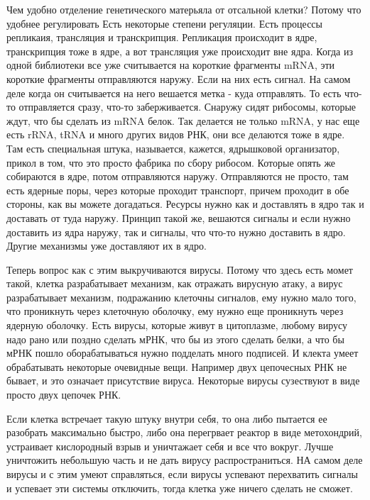 Чем удобно отделение генетического матерьяла от отсальной клетки? 
Потому что удобнее регулировать Есть некоторые степени регуляции. 
Есть процессы репликаия, трансляция и транскрипция. Репликация происходит в ядре, 
транскрипция тоже в ядре, а вот трансляция уже происходит вне ядра. Когда 
из одной библиотеки все уже считывается на короткие фрагменты mRNA, эти 
короткие фрагменты отправляются наружу. Если на них есть сигнал. На самом 
деле когда он считывается на него вешается метка - куда отправлять. То есть 
что-то отправляется сразу, что-то заберживается. Снаружу сидят рибосомы, 
которые ждут, что бы сделать из 
mRNA белок. Так делается не только mRNA, у нас еще есть rRNA, tRNA и 
много других видов РНК, они все делаются тоже в ядре. Там есть 
специальная штука, называется, кажется, ядрышковой организатор, 
прикол в том, что это просто фабрика по сбору рибосом. Которые 
опять же собираются в ядре, потом отправляются наружу. Отправляются 
не просто, там есть ядерные поры, через которые проходит транспорт, 
причем проходит в обе стороны, как вы можете догадаться. Ресурсы нужно как и доставлять 
в ядро так и доставать от туда наружу. Принцип такой же, вешаются 
сигналы и если нужно доставить из ядра наружу, так и 
сигналы, что что-то нужно доставить в ядро. Другие механизмы уже доставляют их в ядро. 

Теперь вопрос как с этим выкручиваются вирусы. Потому что здесь 
есть момет такой, клетка разрабатывает механизм, как
отражать вирусную атаку, а вирус разрабатывает 
механизм, подражанию клеточны сигналов, ему нужно 
мало того, что проникнуть через клеточную оболочку, ему нужно 
еще проникнуть через ядерную оболочку. Есть вирусы, которые
живут в цитоплазме, любому вирусу надо рано или 
поздно сделать мРНК, что бы из этого 
сделать белки, а что бы мРНК пошло оборабатываться нужно подделать 
много подписей. И клекта умеет обрабатывать некоторые очевидные вещи. 
Например двух цепочесных РНК не бывает, и это означает присутствие 
вируса. Некоторые вирусы сузествуют в виде просто двух цепочек РНК. 

Если клетка встречает такую штуку внутри себя, то она 
либо пытается ее разобрать максимально быстро, либо она перегрвает 
реактор в виде метохондрий, устраивает кислородный взрыв и уничтажает себя и 
все что вокруг. Лучше уничтожить небольшую часть и не дать вирусу распространиться. 
НА самом деле вирусы и с этим умеют справляться, если 
вирусы успевают перехватить сигналы и успевает эти системы отключить, 
тогда клетка уже ничего сделать не сможет. 

